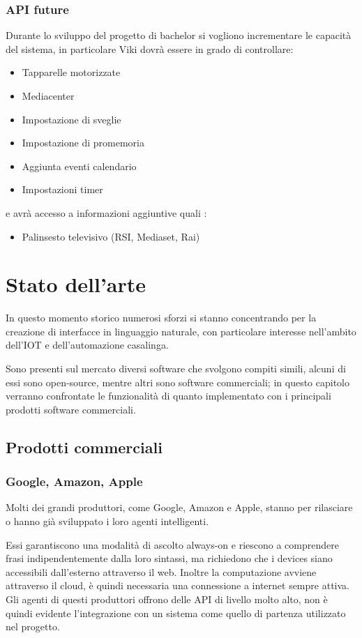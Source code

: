 \documentclass[twoside]{supsistudent}
\begin{document}
\subsection{API future}
Durante lo sviluppo del progetto di bachelor si vogliono incrementare le capacità del sistema, in particolare Viki dovrà essere in grado di controllare:
\begin{itemize}
  \item Tapparelle motorizzate
  \item Mediacenter
  \item Impostazione di sveglie
  \item Impostazione di promemoria
  \item Aggiunta eventi calendario
  \item Impostazioni timer
\end{itemize}
e avrà accesso a informazioni aggiuntive quali :
\begin{itemize}
  \item Palinsesto televisivo (RSI, Mediaset, Rai)
\end{itemize}

\chapter{Stato dell'arte}

In questo momento storico numerosi sforzi si stanno concentrando per la creazione di interfacce in linguaggio naturale, con particolare interesse nell'ambito dell'IOT  e dell'automazione casalinga. 

Sono presenti sul mercato diversi software che svolgono compiti simili, alcuni di essi sono open-source, mentre altri sono software commerciali; in questo capitolo verranno confrontate le funzionalità di quanto implementato con i principali prodotti software commerciali.
\section{Prodotti commerciali}
\subsection{Google, Amazon, Apple}
Molti dei grandi produttori, come Google, Amazon e Apple, stanno per rilasciare o hanno già sviluppato i loro agenti intelligenti. \cite{googleAgent}\cite{homekit}\cite{alexa}

Essi garantiscono una modalità di ascolto always-on e riescono a comprendere frasi indipendentemente dalla loro sintassi, ma richiedono che i devices siano accessibili dall'esterno attraverso il web. Inoltre la computazione avviene attraverso il cloud, è quindi necessaria una connessione a internet sempre attiva.
Gli agenti di questi produttori offrono delle API di livello molto alto, non è quindi evidente l'integrazione con un sistema come quello di partenza utilizzato nel progetto.
\end{document}
